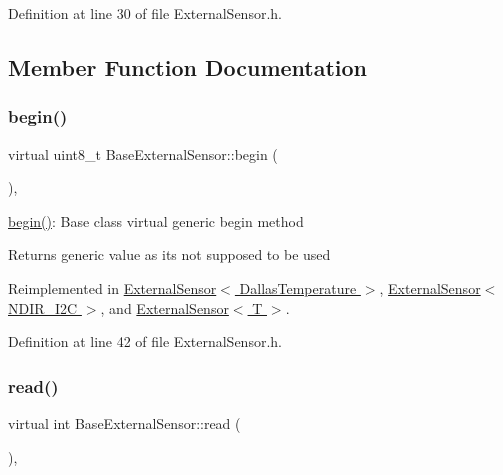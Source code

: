 Definition at line 30 of file External\+Sensor.\+h.



\subsection{Member Function Documentation}
\mbox{\label{class_base_external_sensor_a87d132803d4f4fdd4e66332809f0c9a0}} 
\subsubsection{\texorpdfstring{begin()}{begin()}}
{\footnotesize\ttfamily virtual uint8\+\_\+t Base\+External\+Sensor\+::begin (\begin{DoxyParamCaption}{ }\end{DoxyParamCaption})\hspace{0.3cm}{\ttfamily [inline]}, {\ttfamily [virtual]}}

\hyperlink{class_base_external_sensor_a87d132803d4f4fdd4e66332809f0c9a0}{begin()}\+: Base class virtual generic begin method

\begin{DoxyReturn}{Returns}
generic value as it\textquotesingle{}s not supposed to be used 
\end{DoxyReturn}


Reimplemented in \hyperlink{class_external_sensor_3_01_dallas_temperature_01_4_ac5275129b05e2ff8df45d5b222a661d9}{External\+Sensor$<$ Dallas\+Temperature $>$}, \hyperlink{class_external_sensor_3_01_n_d_i_r___i2_c_01_4_ac6f3614d94968ef0cc11b2b4d69cef03}{External\+Sensor$<$ N\+D\+I\+R\+\_\+\+I2\+C $>$}, and \hyperlink{class_external_sensor_ab6fe1379d55b656a048e0fba1e0a32e6}{External\+Sensor$<$ T $>$}.



Definition at line 42 of file External\+Sensor.\+h.

\mbox{\label{class_base_external_sensor_a7e0a98f350148d7645031315657aa5ec}} 
\subsubsection{\texorpdfstring{read()}{read()}}
{\footnotesize\ttfamily virtual int Base\+External\+Sensor\+::read (\begin{DoxyParamCaption}{ }\end{DoxyParamCaption})\hspace{0.3cm}{\ttfamily [inline]}, {\ttfamily [virtual]}}

